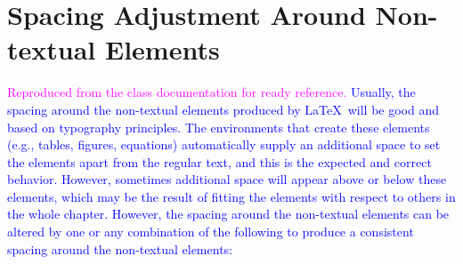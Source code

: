 \documentclass[phd,showframe]{ndsu-thesis-2022}
\newcommand\italk[1]{\textcolor{blue}{#1}}  %
\begin{document}
\section{Spacing Adjustment Around Non-textual Elements}
\textcolor{magenta}{Reproduced from the class documentation	for ready reference.} \italk{Usually, the spacing around the non-textual elements produced by \LaTeX\ will be good and based on typography principles. The environments that create these elements (e.g., tables, figures, equations) automatically supply an additional space to set the elements apart from the regular text, and this is the expected and correct behavior. However, sometimes additional space will appear above or below these elements, which may be the result of fitting the elements with respect to others in the whole chapter. However, the spacing around the non-textual elements can be altered by one or any combination of the following to produce a consistent spacing around the non-textual elements:}
\end{document}
